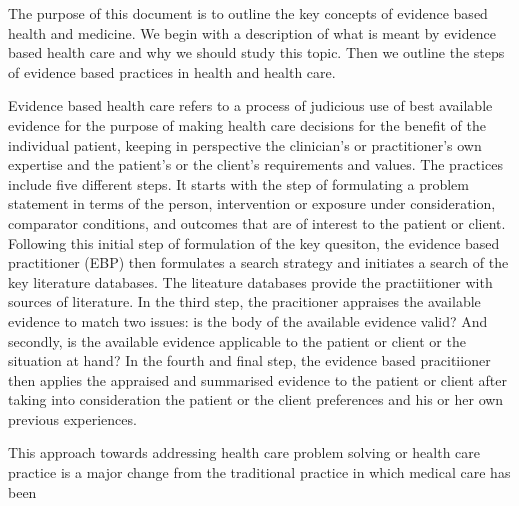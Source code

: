The purpose of this document is to outline the key concepts of evidence based health and medicine. We begin with a description of what is meant by evidence based health care and why we should study this topic. Then we outline the steps of evidence based practices in health and health care. 

Evidence based health care refers to a process of judicious use of best available evidence for the purpose of making health care decisions for the benefit of the individual patient, keeping in perspective the clinician's or practitioner's own expertise and the patient's or the client's requirements and values. The practices include five different steps. It starts with the step of formulating a problem statement in terms of the person, intervention or exposure under consideration, comparator conditions, and outcomes that are of interest to the patient or client. Following this initial step of formulation of the key quesiton, the evidence based practitioner (EBP) then formulates a search strategy and initiates a search of the key literature databases. The liteature databases provide the practiitioner with sources of literature. In the third step, the pracitioner appraises the available evidence to match two issues: is the body of the available evidence valid? And secondly, is the available evidence applicable to the patient or client or the situation at hand? In the fourth and final step, the evidence based pracitiioner then applies the appraised and summarised evidence to the patient or client after taking into consideration the patient or the client preferences and his or her own previous experiences. 

This approach towards addressing health care problem solving or health care practice is a major change from the traditional practice in which medical care has been 
